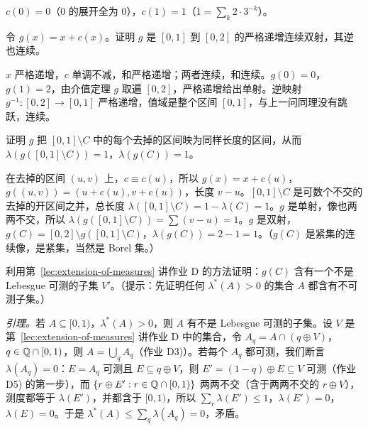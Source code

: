\begin{probleme}
\begin{questions}
\begin{solution}
$c(0)=0$（$0$ 的展开全为 $0$），$c(1)=1$（$1=\sum_k2\cdot3^{-k}$）。
\end{solution}
\item 令 $g(x)=x+c(x)$。证明 $g$ 是 $[0,1]$ 到 $[0,2]$ 的严格递增连续双射，其逆也连续。
\begin{solution}
$x$ 严格递增，$c$ 单调不减，和严格递增；两者连续，和连续。$g(0)=0$，$g(1)=2$，由介值定理 $g$ 取遍 $[0,2]$，严格递增给出单射。逆映射 $g^{-1}:[0,2]\to[0,1]$ 严格递增，值域是整个区间 $[0,1]$，与上一问同理没有跳跃，连续。
\end{solution}
\item 证明 $g$ 把 $[0,1]\setminus C$ 中的每个去掉的区间映为同样长度的区间，从而 $\lambda(g([0,1]\setminus C))=1$，$\lambda(g(C))=1$。
\begin{solution}
在去掉的区间 $(u,v)$ 上，$c\equiv c(u)$，所以 $g(x)=x+c(u)$，$g((u,v))=(u+c(u),v+c(u))$，长度 $v-u$。$[0,1]\setminus C$ 是可数个不交的去掉的开区间之并，总长度 $\lambda([0,1]\setminus C)=1-\lambda(C)=1$。$g$ 是单射，像也两两不交，所以 $\lambda(g([0,1]\setminus C))=\sum(v-u)=1$。$g$ 是双射，$g(C)=[0,2]\setminus g([0,1]\setminus C)$，$\lambda(g(C))=2-1=1$。（$g(C)$ 是紧集的连续像，是紧集，当然是 Borel 集。）
\end{solution}
\item 利用第~\ref{lec:extension-of-measures} 讲作业 D 的方法证明：$g(C)$ 含有一个不是 Lebesgue 可测的子集 $V'$。（提示：先证明任何 $\lambda^*(A)>0$ 的集合 $A$ 都含有不可测子集。）
\begin{solution}
\emph{引理。}若 $A\subseteq[0,1)$，$\lambda^*(A)>0$，则 $A$ 有不是 Lebesgue 可测的子集。设 $V$ 是第~\ref{lec:extension-of-measures} 讲作业 D 中的集合，令 $A_q=A\cap(q\oplus V)$，$q\in\mathbb{Q}\cap[0,1)$，则 $A=\bigcup_qA_q$（作业 D3)）。若每个 $A_q$ 都可测，我们断言 $\lambda(A_q)=0$：$E=A_q$ 可测且 $E\subseteq q\oplus V$，则 $E'=(1-q)\oplus E\subseteq V$ 可测（作业 D5) 的第一步），而 $\{r\oplus E':r\in\mathbb{Q}\cap[0,1)\}$ 两两不交（含于两两不交的 $r\oplus V$），测度都等于 $\lambda(E')$，并都含于 $[0,1)$，所以 $\sum_r\lambda(E')\leqslant1$，$\lambda(E')=0$，$\lambda(E)=0$。于是 $\lambda^*(A)\leqslant\sum_q\lambda(A_q)=0$，矛盾。


\end{solution}
\end{questions}
\end{probleme}

